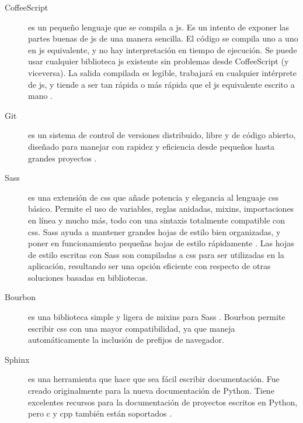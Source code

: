 \begin{description}
\item[CoffeeScript]
es un pequeño lenguaje que se compila a \gls{js}. Es un intento de
exponer las partes buenas de \gls{js} de una manera sencilla. El código
se compila uno a uno en \gls{js} equivalente, y no hay interpretación en
tiempo de ejecución. Se puede usar cualquier biblioteca \gls{js}
existente sin problemas desde CoffeeScript (y viceversa). La salida
compilada es legible, trabajará en cualquier intérprete de \gls{js}, y
tiende a ser tan rápida o más rápida que el \gls{js} equivalente escrito
a mano \cite{coffeescript}.
\item[Git]
es un sistema de control de versiones distribuido, libre y de código
abierto, diseñado para manejar con rapidez y eficiencia desde pequeños
hasta grandes proyectos \cite{git}.
\item[Sass]
es una extensión de \gls{css} que añade potencia y elegancia al lenguaje
\gls{css} básico. Permite el uso de variables, reglas anidadas,
\glspl{mixin}, importaciones en línea y mucho más, todo con una sintaxis
totalmente compatible con \gls{css}. Sass ayuda a mantener grandes hojas
de estilo bien organizadas, y poner en funcionamiento pequeñas hojas de
estilo rápidamente \cite{sass}. Las hojas de estilo escritas con Sass
son compiladas a \gls{css} para ser utilizadas en la aplicación,
resultando ser una opción eficiente con respecto de otras soluciones
basadas en bibliotecas.
\item[Bourbon]
es una biblioteca simple y ligera de \glspl{mixin} para Sass
\cite{bourbon}. Bourbon permite escribir \gls{css} con una mayor
compatibilidad, ya que maneja automáticamente la inclusión de prefijos
de \gls{navegador}.
\item[Sphinx]
es una herramienta que hace que sea fácil escribir documentación. Fue
creado originalmente para la nueva documentación de Python. Tiene
excelentes recursos para la documentación de proyectos escritos en
Python, pero \gls{c} y \gls{cpp} también están soportados \cite{sphinx}.
\end{description}
